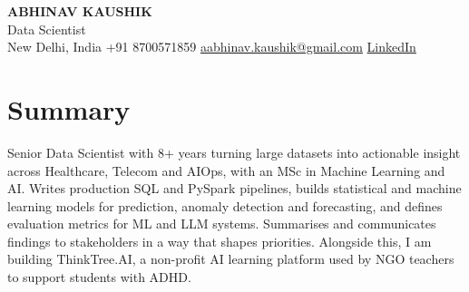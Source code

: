 \documentclass[10pt,a4paper]{article}
\begin{document}
\begin{center}
  {\LARGE\bfseries ABHINAV KAUSHIK}\\[2pt]
  {\large Data Scientist}\\[2pt]
  New Delhi, India \textbar{} +91 8700571859 \textbar{} \href{mailto:aabhinav.kaushik@gmail.com}{aabhinav.kaushik@gmail.com} \textbar{} \href{https://www.linkedin.com/in/abhinav-kaushik10/}{LinkedIn}  
\end{center}

\section{Summary}
Senior Data Scientist with 8+ years turning large datasets into actionable insight across Healthcare, Telecom and AIOps, with an MSc in Machine Learning and AI. Writes production SQL and PySpark pipelines, builds statistical and machine learning models for prediction, anomaly detection and forecasting, and defines evaluation metrics for ML and LLM systems. Summarises and communicates findings to stakeholders in a way that shapes priorities. Alongside this, I am building ThinkTree.AI, a non-profit AI learning platform used by NGO teachers to support students with ADHD.
\end{document}
